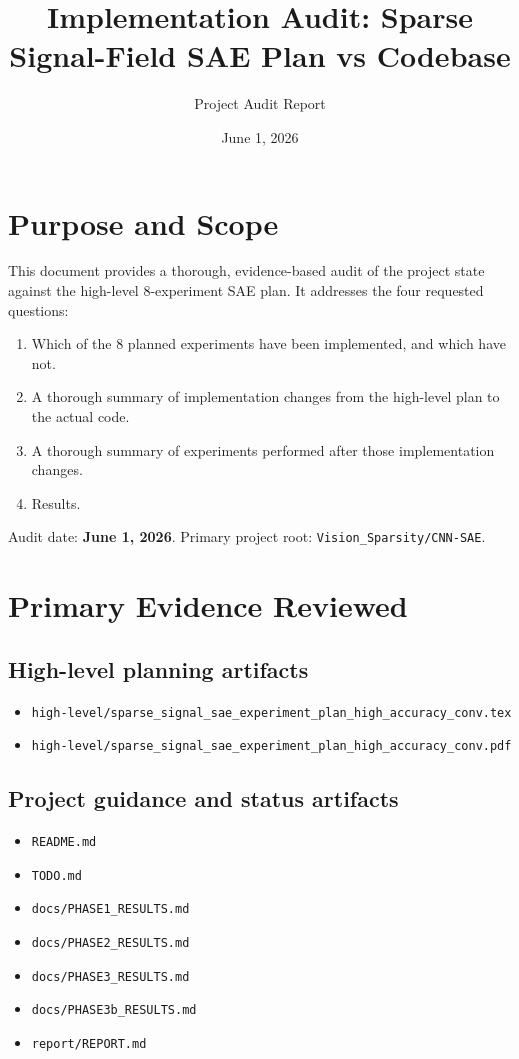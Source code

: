 \documentclass[11pt]{article}
\title{Implementation Audit: Sparse Signal-Field SAE Plan vs Codebase}
\author{Project Audit Report}
\date{June 1, 2026}
\begin{document}
\maketitle

\section{Purpose and Scope}
This document provides a thorough, evidence-based audit of the project state against the high-level 8-experiment SAE plan.
It addresses the four requested questions:
\begin{enumerate}[leftmargin=*]
    \item Which of the 8 planned experiments have been implemented, and which have not.
    \item A thorough summary of implementation changes from the high-level plan to the actual code.
    \item A thorough summary of experiments performed after those implementation changes.
    \item Results.
\end{enumerate}

Audit date: \textbf{June 1, 2026}.\newline
Primary project root: \texttt{Vision\_Sparsity/CNN-SAE}.

\section{Primary Evidence Reviewed}
\subsection{High-level planning artifacts}
\begin{itemize}[leftmargin=*]
    \item \texttt{high-level/sparse\_signal\_sae\_experiment\_plan\_high\_accuracy\_conv.tex}
    \item \texttt{high-level/sparse\_signal\_sae\_experiment\_plan\_high\_accuracy\_conv.pdf}
\end{itemize}

\subsection{Project guidance and status artifacts}
\begin{itemize}[leftmargin=*]
    \item \texttt{README.md}
    \item \texttt{TODO.md}
    \item \texttt{docs/PHASE1\_RESULTS.md}
    \item \texttt{docs/PHASE2\_RESULTS.md}
    \item \texttt{docs/PHASE3\_RESULTS.md}
    \item \texttt{docs/PHASE3b\_RESULTS.md}
    \item \texttt{report/REPORT.md}
\end{itemize}
\end{document}
